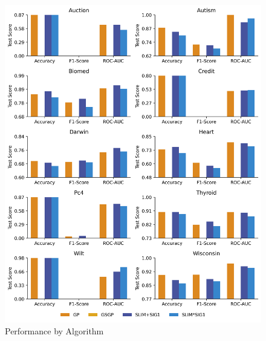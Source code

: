 
    \begin{figure}[H]
    \centering
    \includegraphics[width=\linewidth]{../Latex/Chapters/Figures/Results/comparison_test_performance.png}
    \caption{Performance by Algorithm}
    \label{fig:comparison_test_performance}
    \end{figure}
    